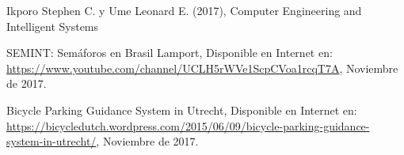 \begin{thebibliography}{9}
	Ikporo Stephen C. y Ume Leonard E. (2017),
	Computer Engineering and Intelligent Systems
	
	SEMINT: Semáforos en Brasil Lamport,
	Disponible en Internet en: \url{https://www.youtube.com/channel/UCLH5rWVe1ScpCVoa1rcqT7A},
	Noviembre de 2017.
	
	Bicycle Parking Guidance System in Utrecht,
	Disponible en Internet en: \url{https://bicycledutch.wordpress.com/2015/06/09/bicycle-parking-guidance-system-in-utrecht/},
	Noviembre de 2017.
	
\end{thebibliography}

